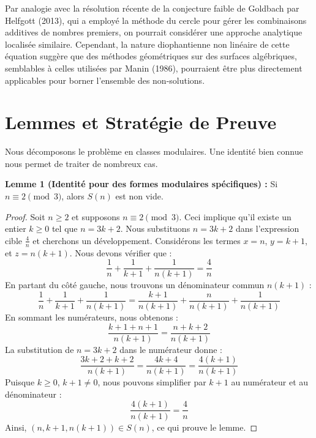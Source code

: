 \documentclass[12pt]{article}
\begin{document}
Par analogie avec la résolution récente de la conjecture faible de Goldbach par Helfgott (2013), qui a employé la méthode du cercle pour gérer les combinaisons additives de nombres premiers, on pourrait considérer une approche analytique localisée similaire. Cependant, la nature diophantienne non linéaire de cette équation suggère que des méthodes géométriques sur des surfaces algébriques, semblables à celles utilisées par Manin (1986), pourraient être plus directement applicables pour borner l'ensemble des non-solutions.

\section{Lemmes et Stratégie de Preuve}

Nous décomposons le problème en classes modulaires. Une identité bien connue nous permet de traiter de nombreux cas.

\textbf{Lemme 1 (Identité pour des formes modulaires spécifiques) :} Si $n \equiv 2 \pmod{3}$, alors $S(n)$ est non vide.

\begin{proof}
Soit $n \ge 2$ et supposons $n \equiv 2 \pmod{3}$. Ceci implique qu'il existe un entier $k \ge 0$ tel que $n = 3k + 2$.
Nous substituons $n = 3k + 2$ dans l'expression cible $\frac{4}{n}$ et cherchons un développement.
Considérons les termes $x = n$, $y = k+1$, et $z = n(k+1)$. Nous devons vérifier que :
\begin{equation}
\frac{1}{n} + \frac{1}{k+1} + \frac{1}{n(k+1)} = \frac{4}{n}
\end{equation}
En partant du côté gauche, nous trouvons un dénominateur commun $n(k+1)$ :
\begin{equation}
\frac{1}{n} + \frac{1}{k+1} + \frac{1}{n(k+1)} = \frac{k+1}{n(k+1)} + \frac{n}{n(k+1)} + \frac{1}{n(k+1)}
\end{equation}
En sommant les numérateurs, nous obtenons :
\begin{equation}
\frac{k+1 + n + 1}{n(k+1)} = \frac{n + k + 2}{n(k+1)}
\end{equation}
La substitution de $n = 3k + 2$ dans le numérateur donne :
\begin{equation}
\frac{3k + 2 + k + 2}{n(k+1)} = \frac{4k + 4}{n(k+1)} = \frac{4(k+1)}{n(k+1)}
\end{equation}
Puisque $k \ge 0$, $k+1 \neq 0$, nous pouvons simplifier par $k+1$ au numérateur et au dénominateur :
\begin{equation}
\frac{4(k+1)}{n(k+1)} = \frac{4}{n}
\end{equation}
Ainsi, $(n, k+1, n(k+1)) \in S(n)$, ce qui prouve le lemme.
\end{proof}
\end{document}
